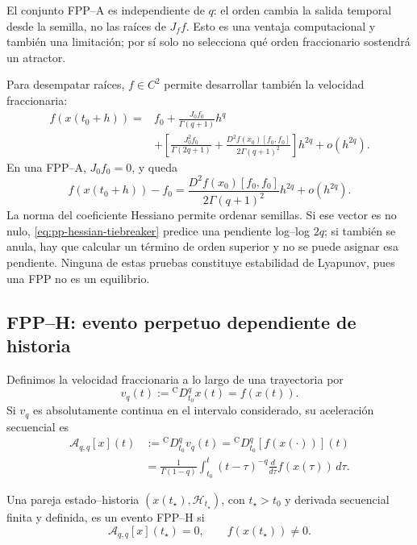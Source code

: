El conjunto FPP--A es independiente de \(q\): el orden cambia la salida
temporal desde la semilla, no las raíces de \(J_f f\). Esto es una ventaja
computacional y también una limitación; por sí solo no selecciona qué orden
fraccionario sostendrá un atractor.

Para desempatar raíces, \(f\in C^2\) permite desarrollar también la velocidad
fraccionaria:
\begin{align}
 f(x(t_0+h))
 ={}&f_0+\frac{J_0 f_0}{\Gamma(q+1)}h^q\\
 &+\left[
 \frac{J_0^2f_0}{\Gamma(2q+1)}
 +\frac{D^2f(x_0)[f_0,f_0]}{2\Gamma(q+1)^2}
 \right]h^{2q}+o(h^{2q}).
 \label{eq:pp-fractional-velocity-second}
\end{align}
En una FPP--A, \(J_0 f_0=0\), y queda
\begin{equation}
 f(x(t_0+h))-f_0
 =\frac{D^2f(x_0)[f_0,f_0]}{2\Gamma(q+1)^2}h^{2q}
 +o(h^{2q}).
 \label{eq:pp-hessian-tiebreaker}
\end{equation}
La norma del coeficiente Hessiano permite ordenar semillas. Si ese vector
es no nulo, \cref{eq:pp-hessian-tiebreaker} predice una pendiente log--log
\(2q\); si también se anula, hay que calcular un término de orden superior
y no se puede asignar esa pendiente. Ninguna de estas pruebas constituye
estabilidad de Lyapunov, pues una FPP no es un equilibrio.

\subsection{FPP--H: evento perpetuo dependiente de historia}

Definimos la velocidad fraccionaria a lo largo de una trayectoria por
\begin{equation}
 v_q(t):={}^{\mathrm C}D_{t_0}^qx(t)=f(x(t)).
\end{equation}
Si \(v_q\) es absolutamente continua en el intervalo considerado, su
aceleración secuencial es
\begin{align}
 \mathcal A_{q,q}[x](t)
 &:={}^{\mathrm C}D_{t_0}^qv_q(t)
 ={}^{\mathrm C}D_{t_0}^q[f(x(\cdot))](t)
 \label{eq:fpph-sequential-definition}\\
 &=\frac1{\Gamma(1-q)}
 \int_{t_0}^{t}(t-\tau)^{-q}
 \frac{d}{d\tau}f(x(\tau))\,d\tau.
 \label{eq:fpph-history-integral}
\end{align}

\begin{definition}
Una pareja estado--historia \((x(t_\star),\mathcal H_{t_\star})\), con
\(t_\star>t_0\) y derivada secuencial finita y definida, es un evento
FPP--H si
\begin{equation}
 \mathcal A_{q,q}[x](t_\star)=0,
 \qquad f(x(t_\star))\neq0.
 \label{eq:fpph-event}
\end{equation}
\end{definition}

